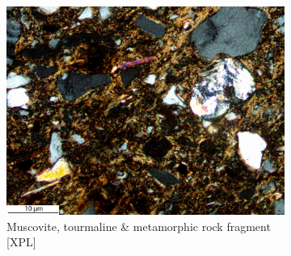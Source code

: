 \documentclass[a4paper]{article}
\begin{document}
\begin{figure}[H]
	\begin{subfigure}[t]{.32\textwidth}
		\includegraphics[width=\textwidth]{ThinSections/48-6_20x_XPL.jpg}
		\caption{Muscovite, tourmaline \& metamorphic rock fragment [XPL]}
	\end{subfigure}
	\caption{}
	\label{fig:48_waf}
\end{figure}
\end{document}
